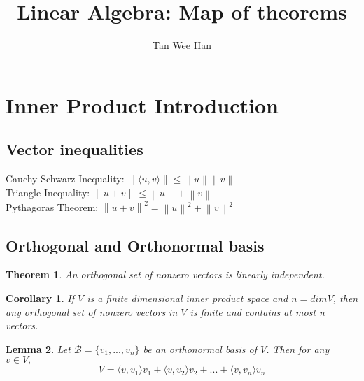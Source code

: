\documentclass{article}
\newcommand{\norm}[1]{\left\lVert#1\right\rVert}
\newcommand{\innerproduct}[1]{\langle#1\rangle}
\newtheorem{theorem}{Theorem}[section]
\newtheorem{corollary}{Corollary}[theorem]
\newtheorem{lemma}[theorem]{Lemma}
\numberwithin{theorem}{subsection} %
\numberwithin{definition}{subsection} %
\numberwithin{proposition}{subsection} %
\begin{document}
\title{\Large{\textbf{Linear Algebra: Map of theorems}}}
\author{Tan Wee Han}
\maketitle

\let\cleardoublepage\clearpage
\tableofcontents

\pagestyle{plain} %

\makeatletter
\makeatother


\section{Inner Product Introduction}


\subsection{Vector inequalities}
Cauchy-Schwarz Inequality: $\norm{\innerproduct{u,v}} \leq \norm{u}\norm{v}$ \\
Triangle Inequality: $\norm{u+v} \leq \norm{u} + \norm{v}$ \\
Pythagoras Theorem: $\norm{u+v}^2 = \norm{u}^2 + \norm{v}^2$ \bigskip

\subsection{Orthogonal and Orthonormal basis}
\begin{theorem}
    An orthogonal set of nonzero vectors is linearly independent.
\end{theorem}

\begin{corollary}
    If $V$ is a finite dimensional inner product space and $n=dim V$, then any orthogonal set of nonzero vectors in $V$ is finite and contains at most n vectors.
\end{corollary}

\begin{lemma}
    Let $ \mathcal{B} = \{v_1,...,v_n\}$ be an orthonormal basis of $V$. Then for any $v \in V,$ \\
    \begin{equation*}
        V = \innerproduct{v,v_1}v_1 + \innerproduct{v,v_2}v_2 +...+
        \innerproduct{v,v_n}v_n
    \end{equation*}
\end{lemma}
\end{document}
